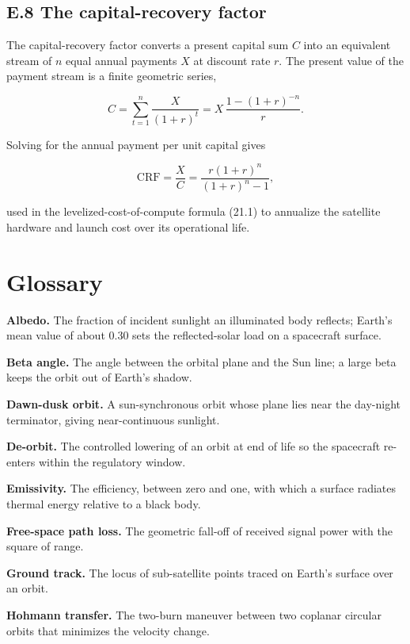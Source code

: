\documentclass[
  11pt,
  openany,
  oneside]{book}
\begin{document}
\section{E.8 The capital-recovery
factor}\label{e.8-the-capital-recovery-factor}

The capital-recovery factor converts a present capital sum \(C\) into an
equivalent stream of \(n\) equal annual payments \(X\) at discount rate
\(r\). The present value of the payment stream is a finite geometric
series,

\[C = \sum_{t=1}^{n} \frac{X}{(1+r)^t} = X\,\frac{1 - (1+r)^{-n}}{r}.\]

Solving for the annual payment per unit capital gives

\[\mathrm{CRF} = \frac{X}{C} = \frac{r(1+r)^n}{(1+r)^n - 1},\]

used in the levelized-cost-of-compute formula (21.1) to annualize the
satellite hardware and launch cost over its operational life.

\chapter{Glossary}\label{glossary}

\textbf{Albedo.} The fraction of incident sunlight an illuminated body
reflects; Earth's mean value of about 0.30 sets the reflected-solar load
on a spacecraft surface.

\textbf{Beta angle.} The angle between the orbital plane and the Sun
line; a large beta keeps the orbit out of Earth's shadow.

\textbf{Dawn-dusk orbit.} A sun-synchronous orbit whose plane lies near
the day-night terminator, giving near-continuous sunlight.

\textbf{De-orbit.} The controlled lowering of an orbit at end of life so
the spacecraft re-enters within the regulatory window.

\textbf{Emissivity.} The efficiency, between zero and one, with which a
surface radiates thermal energy relative to a black body.

\textbf{Free-space path loss.} The geometric fall-off of received signal
power with the square of range.

\textbf{Ground track.} The locus of sub-satellite points traced on
Earth's surface over an orbit.

\textbf{Hohmann transfer.} The two-burn maneuver between two coplanar
circular orbits that minimizes the velocity change.
\end{document}
